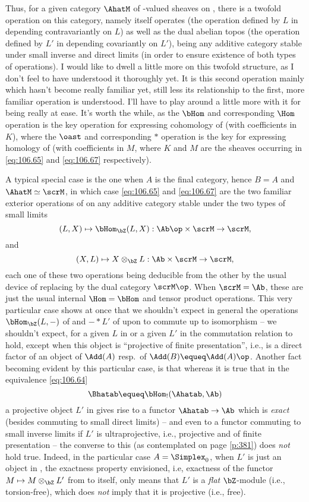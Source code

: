 Thus, for a given category $\AhatM$ of \scrM-valued sheaves on
\Ahatab, there is a twofold operation on this category, namely
\Ahatab{} itself operates (the operation defined by $L$ in \Ahatab{}
depending contravariantly on $L$) as well as the dual abelian topos
\Bhatab{} (the operation defined by $L'$ in \Bhatab{} depending
covariantly on $L'$), \scrM{} being any additive category stable under
small inverse and direct limits (in order to ensure existence of both
types of operations). I would like to dwell a little more on this
twofold structure, as I don't feel to have understood it thoroughly
yet. It is this second operation mainly which hasn't become really
familiar yet, still less its relationship to the first, more
familiar operation is understood. I'll have to play around
a little more with it for being really at ease. It's worth the while,
as the $\bHom$ and corresponding $\Hom$ operation is the key operation
for expressing cohomology of \Ahat{} (with coefficients in $K$), where the
$\oast$ and corresponding $*$ operation is the key for expressing
homology of \Ahat{} (with coefficients in $M$, where $K$ and $M$ are
the sheaves occurring in \eqref{eq:106.65} and \eqref{eq:106.67}
respectively).

A typical special case is the one when $A$ is the final category,
hence $B=A$ and $\AhatM\simeq \scrM$, in which case
\eqref{eq:106.65} and \eqref{eq:106.67} are the two familiar exterior
operations of \Ab{} on any additive category stable under the two
types of small limits
\[ (L,X)\mapsto \bHom_{\bZ}(L,X): \Ab\op\times\scrM\to\scrM,\]
and
\[ (X,L)\mapsto X\otimes_{\bZ} L:\Ab\times\scrM\to\scrM,\]
each one of these two operations being deducible from the other by the
usual device of replacing \scrM{} by the dual category
$\scrM\op$. When $\scrM=\Ab$, these are just the usual internal
$\Hom=\bHom$ and tensor product operations. This very particular case
shows at once that we shouldn't expect in general the operations
$\bHom_{\bZ}(L,{-})$ of \Ahatab{} and ${-} * L'$ of \Bhatab{} upon
\AhatM{} to commute up to isomorphism -- we shouldn't expect, for a
given $L$ in \Ahatab{} or a given $L'$ in \Bhatab{} the commutation
relation to hold, except when this object is ``projective of finite
presentation'', i.e., is a direct factor of an object of $\Add(A)$
resp.\ of $\Add(B)\equeq\Add(A)\op$. Another fact becoming evident by
this particular case, is that whereas it is true that in the
equivalence \eqref{eq:106.64}
\[\Bhatab \equeq \bHom_!(\Ahatab,\Ab)\]
a projective object $L'$ in \Bhatab{} gives rise to a functor
$\Ahatab\to\Ab$ which is \emph{exact} (besides commuting to small
direct limits) -- and even to a functor commuting to small inverse
limits if $L'$ is ultraprojective, i.e., projective and of finite
presentation -- the converse to this (as contemplated on page
\ref{p:381}) does \emph{not} hold true. Indeed, in the particular case
$A=\Simplex_0$, when $L'$ is just an object in \Ab, the exactness
property envisioned, i.e, exactness of the functor $M\mapsto
M\otimes_{\bZ} L'$ from \Ab{} to itself, only means that $L'$ is a
\emph{flat} $\bZ$-module (i.e., torsion-free), which does \emph{not}
imply that it is projective (i.e., free). 

